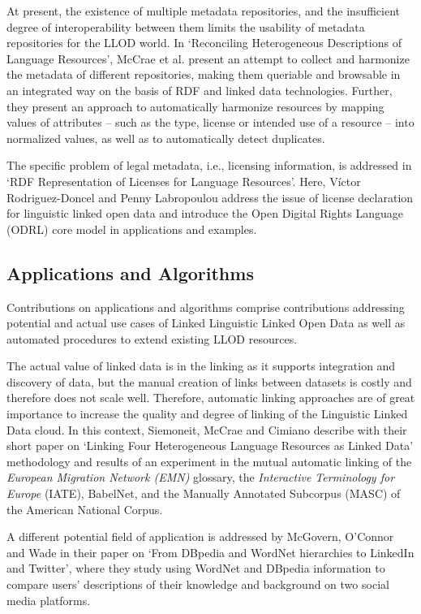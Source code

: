 At present, the existence of multiple metadata repositories, and the insufficient degree of interoperability between them limits the usability of metadata repositories for the LLOD world. 
In `Reconciling Heterogeneous Descriptions of Language Resources', McCrae et al. present an attempt to collect and harmonize the metadata of different repositories, making them queriable and browsable in an integrated way on the basis of RDF and linked data technologies. Further, they present an approach to automatically harmonize resources by mapping values of attributes -- such as the type, license or intended use of a resource -- into normalized values, as well as to automatically detect duplicates.

The specific problem of legal metadata, i.e., licensing information, is addressed in `RDF Representation of Licenses for Language Resources'. 
Here, Víctor Rodriguez-Doncel and Penny Labropoulou address the issue of license declaration for linguistic linked open data and introduce the Open Digital Rights Language (ODRL) core model in applications and examples.

\subsection{Applications and Algorithms}

Contributions on applications and algorithms comprise contributions addressing potential and actual use cases of Linked Linguistic Linked Open Data as well as automated procedures to extend existing LLOD resources.

The actual value of linked data is in the linking as it supports integration and discovery of data, but the manual creation of links between datasets is costly and therefore does not scale well. Therefore, automatic linking approaches are of great importance to increase the quality and degree of linking of the Linguistic Linked Data cloud.
In this context, Siemoneit, McCrae and Cimiano describe with their short paper on `Linking Four Heterogeneous Language Resources as Linked Data' methodology and results of an experiment in the mutual automatic linking of the \emph{European Migration Network (EMN)} glossary, the \emph{Interactive Terminology for Europe} (IATE), BabelNet, and the Manually Annotated Subcorpus (MASC) of the American National Corpus.

A different potential field of application is addressed by McGovern, O'Connor and Wade in their paper on `From DBpedia and WordNet hierarchies to LinkedIn and Twitter', where they study using WordNet and DBpedia information to compare users' descriptions of their knowledge and background on two social media platforms.

